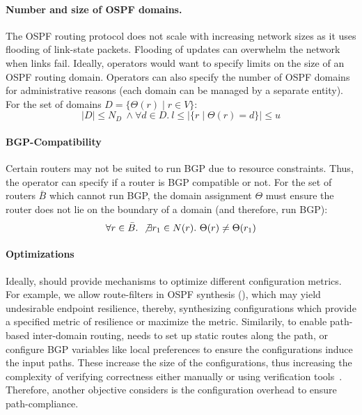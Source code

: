 \paragraph{Number and size of OSPF domains.} 
The OSPF routing protocol does not scale 
with increasing network sizes
as it uses
flooding of link-state packets. Flooding 
of updates can  
overwhelm the network when links fail. 
Ideally, operators would want to specify
limits on the size of an OSPF routing domain. 
Operators can also specify the number of OSPF domains
for administrative reasons (each domain can be
managed by a separate entity). For the  
set of domains $D = \{\Theta(r) \mid r \in V\}$:
\begin{equation}
	|D| \leq N_{D} ~\wedge \forall d \in D. ~l \leq |\{r \mid \Theta(r) = d\}| \leq u
\end{equation}

\paragraph{BGP-Compatibility} Certain 
	routers may not be suited to run BGP due to resource
	constraints. Thus, the operator can specify if a 
	router is BGP compatible or not.  
	For the set of routers $\bar{B}$ which cannot run BGP, the
	domain assignment $\Theta$ must ensure the router
	does not lie on the boundary of a domain (and therefore,
	run BGP):
\begin{equation}
	\forall r \in \bar{B}. ~\not\exists r_1 \in N(r).~\Theta(r) \not= \Theta(r_1) 
\end{equation} 

\paragraph{Optimizations}  
Ideally, \name should provide mechanisms to optimize
different configuration metrics. For example,
we allow route-filters in OSPF synthesis 
(), which may yield undesirable
endpoint resilience, thereby, synthesizing configurations
which provide a specified metric of resilience or maximize
the metric. Similarily, to enable path-based inter-domain routing, 
\name needs	to set up static routes along the path, or configure BGP 
variables like local preferences to ensure the configurations 
induce the input paths.
These increase the size of the configurations,
thus increasing the complexity of verifying correctness either 
manually or using verification tools~\cite{batfish, arc, era}. 
Therefore,
another objective \name considers is the configuration overhead
to ensure path-compliance.